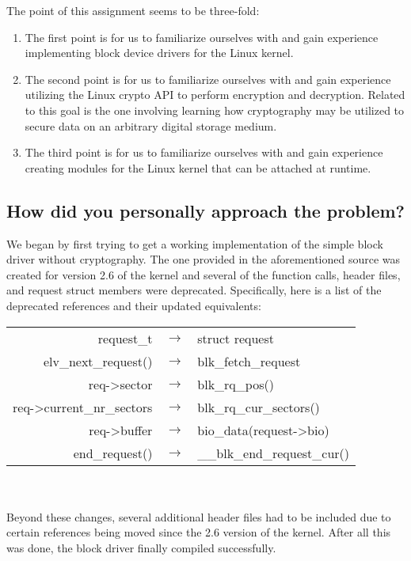 \documentclass[letterpaper,10pt,titlepage,draftclsnofoot,onecolumn]{article}
\begin{document}
The point of this assignment seems to be three-fold:
\begin{enumerate}
\item The first point is for us to familiarize ourselves with and gain experience implementing block device drivers for the Linux kernel.

\item The second point is for us to familiarize ourselves with and gain experience utilizing the Linux crypto API to perform encryption and decryption. Related to this goal is the one involving learning how cryptography may be utilized to secure data on an arbitrary digital storage medium.

\item The third point is for us to familiarize ourselves with and gain experience creating modules for the Linux kernel that can be attached at runtime.
\end{enumerate}

\subsection{How did you personally approach the problem?}

We began by first trying to get a working implementation of the simple block driver without cryptography. The one provided in the aforementioned source was created for version 2.6 of the kernel and several of the function calls, header files, and request struct members were deprecated. Specifically, here is a list of the deprecated references and their updated equivalents:\\
\begin{tabular}{rcl}
request\_t & $\rightarrow$ & struct request \\
elv\_next\_request() & $\rightarrow$ & blk\_fetch\_request \\
req->sector & $\rightarrow$ & blk\_rq\_pos() \\
req->current\_nr\_sectors & $\rightarrow$ & blk\_rq\_cur\_sectors() \\
req->buffer & $\rightarrow$ & bio\_data(request->bio) \\
end\_request() & $\rightarrow$ & \_\_blk\_end\_request\_cur() \\
\end{tabular}\\ \\
Beyond these changes, several additional header files had to be included due to certain references being moved since the 2.6 version of the kernel. After all this was done, the block driver finally compiled successfully. 
\end{document}
